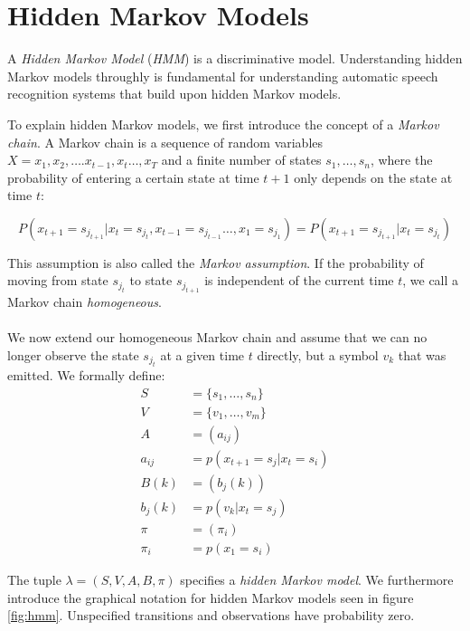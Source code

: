 \section{Hidden Markov Models}
\label{sec:hmm}
A \textit{Hidden Markov Model} (\textit{HMM}) is a discriminative model. Understanding hidden Markov models throughly is fundamental for understanding automatic speech recognition systems that build upon hidden Markov models. 

To explain hidden Markov models, we first introduce the concept of a \textit{Markov chain}. A Markov chain is a sequence of random variables $X = x_1, x_2, \dots. x_{t - 1}, x_{t} \dots, x_T$ and a finite number of states $s_1, \dots, s_n$, where the probability of entering a certain state at time $t + 1$ only depends on the state at time $t$:

\[
P(x_{t + 1} = s_{j_{t + 1}} | x_{t} = s_{j_t}, x_{t - 1} = s_{j_{t - 1}} \dots, x_{1} = s_{j_{1}}) = P(x_{t + 1} = s_{j_{t + 1}} | x_{t} = s_{j_t})
\] 

This assumption is also called the \textit{Markov assumption}. If the probability of moving from state $s_{j_t}$ to state $s_{j_{t + 1}}$ is independent of the current time $t$, we call a Markov chain \textit{homogeneous}. \\ \\
We now extend our homogeneous Markov chain and assume that we can no longer observe the state $s_{j_t}$ at a given time $t$ directly, but a symbol $v_k$ that was emitted. We formally define: 
\begin{align*}
S &= \{s_1, \dots, s_n\} \tag{states} \\
V &= \{v_1, \dots, v_m\} \tag{symbols} \\
A &= (a_{ij}) \tag{state tansmission probability} \\
a_{ij} &= p(x_{t+1} = s_j | x_{t} = s_i) \\
B(k) &= (b_j(k)) \tag{emisson probability} \\
b_j(k) &= p(v_k | x_t = s_j) \\
\pi &= (\pi_i) \tag{initial state probability} \\
\pi_i &= p(x_1 = s_i)
\end{align*}

The tuple $\lambda = (S, V, A, B, \pi)$ specifies a \textit{hidden Markov model}. We furthermore introduce the graphical notation for hidden Markov models seen in figure \ref{fig:hmm}. Unspecified transitions and observations have probability zero. \\ 

